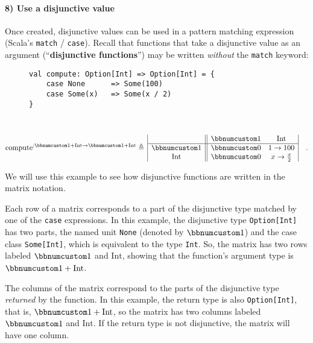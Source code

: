 \paragraph{8) Use a disjunctive value}

Once created, disjunctive values can be used in a pattern matching
expression (Scala's \lstinline!match! / \lstinline!case!). Recall
that functions that take a disjunctive value as an argument (\textsf{``}\textbf{disjunctive
functions}\textsf{''}) may be written \emph{without} the \lstinline!match!
keyword:

\begin{wrapfigure}{l}{0.5\columnwidth}%
\vspace{-0.65\baselineskip}
\begin{lstlisting}
val compute: Option[Int] => Option[Int] = {
    case None      => Some(100)
    case Some(x)   => Some(x / 2)
}
\end{lstlisting}

\vspace{-1.65\baselineskip}
\end{wrapfigure}%

~\vspace{-1.45\baselineskip}
\[
\text{compute}^{:\bbnum 1+\text{Int}\rightarrow\bbnum 1+\text{Int}}\triangleq\,\begin{array}{|c||cc|}
 & \bbnum 1 & \text{Int}\\
\hline \bbnum 1 & \bbnum 0 & 1\rightarrow100\\
\text{Int} & \bbnum 0 & x\rightarrow\frac{x}{2}
\end{array}\quad.
\]
\vspace{-0.9\baselineskip}

We will use this example to see how disjunctive functions are written
in the matrix notation.

Each row of a matrix corresponds to a part of the disjunctive type
matched by one of the \lstinline!case! expressions. In this example,
the disjunctive type \lstinline!Option[Int]! has two parts, the named
unit \lstinline!None! (denoted by $\bbnum 1$) and the case class
\lstinline!Some[Int]!, which is equivalent to the type \lstinline!Int!.
So, the matrix has two rows labeled $\bbnum 1$ and $\text{Int}$,
showing that the function's argument type is $\bbnum 1+\text{Int}$.

The columns of the matrix correspond to the parts of the disjunctive
type \emph{returned} by the function. In this example, the return
type is also \lstinline!Option[Int]!, that is, $\bbnum 1+\text{Int}$,
so the matrix has two columns labeled $\bbnum 1$ and $\text{Int}$.
If the return type is not disjunctive, the matrix will have one column.

